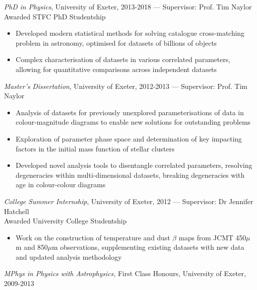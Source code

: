 \documentclass[letter, margin, 10pt]{res} %
\begin{document}
\begin{resume}
{\sl PhD in Physics}, University of Exeter, 2013-2018 --- Supervisor: Prof. Tim Naylor\\
\null\quad\quad Awarded STFC PhD Studentship
\begin{itemize}[noitemsep,topsep=0pt,parsep=0pt,partopsep=0pt]
\item Developed modern statistical methods for solving catalogue cross-matching problem in astronomy, optimised for datasets of billions of objects
\item Complex characterisation of datasets in various correlated parameters, allowing for quantitative comparisons across independent datasets
\end{itemize}
\vspace{-10pt}
{\sl Master's Dissertation}, University of Exeter, 2012-2013 --- Supervisor: Prof. Tim Naylor
\begin{itemize}[noitemsep,topsep=0pt,parsep=0pt,partopsep=0pt]
\item Analysis of datasets for previously unexplored parameterisations of data in colour-magnitude diagrams to enable new solutions for outstanding problems
\item Exploration of parameter phase space and determination of key impacting factors in the initial mass function of stellar clusters
\item Developed novel analysis tools to disentangle correlated parameters, resolving degeneracies within multi-dimensional datasets, breaking degeneracies with age in colour-colour diagrams
\end{itemize}
\vspace{-10pt}
{\sl College Summer Internship}, University of Exeter, 2012 --- Supervisor: Dr Jennifer Hatchell\\
\null\quad\quad Awarded University College Studentship
\begin{itemize}[noitemsep,topsep=0pt,parsep=0pt,partopsep=0pt]
\item Work on the construction of temperature and dust $\beta$ maps from JCMT 450$\mu$m and 850$\mu$m observations, supplementing existing datasets with new data and updated analysis methodology
\end{itemize}
\vspace{-10pt}
{\sl MPhys in Physics with Astrophysics,} First Class Honours, University of Exeter, 2009-2013

\vspace{-6pt}

\end{resume}
\end{document}
